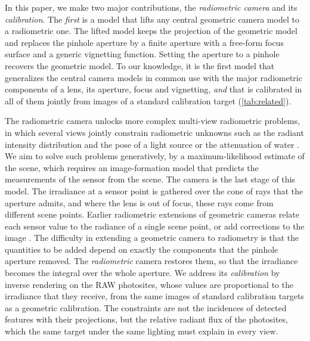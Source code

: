 In this paper, we make two major contributions, the \textit{radiometric camera} and its \textit{calibration}. The \textit{first} is a model that lifts any central geometric camera model to a radiometric
one. The lifted model keeps
the projection of the geometric model and replaces the pinhole
aperture by a finite aperture with a free-form focus surface and a
generic vignetting function. Setting the aperture to a pinhole
recovers the geometric model. To our knowledge, it is the first model
that generalizes the central camera models in common use with the major
radiometric components of a lens, its aperture, focus and vignetting,
\textit{and} that is calibrated in all of them jointly from images of a
standard calibration target (\cref{tab:related}).

The radiometric camera unlocks more complex multi-view radiometric
problems, in which several views jointly constrain radiometric
unknowns such as the radiant intensity distribution and the pose of a
light source
\cite{weber2001practical,park2014nonisotropic,visentini2015simultaneous,santo2018pinmotion}
or the attenuation of water
\cite{bryson2016truecolor,skinner2017automatic,akkaynak2019seathru,nakath2021insitu}.
We aim to solve such problems generatively, \ie by a maximum-likelihood estimate of the scene,
which requires an image-formation model that predicts the measurements
of the sensor from the scene. The camera is the last stage of this
model. The irradiance at a sensor point is gathered over the cone of rays that the
aperture admits, and where the lens is out of focus, these rays come
from different scene points. Earlier radiometric extensions of
geometric cameras relate each sensor value to the radiance of a single
scene point, or add corrections to the image
\cite{Kim-PAMI-2008,rehder2017direct,Hannemose_2019}. The difficulty in extending a geometric camera to
radiometry is that the quantities to be added depend on exactly the components that the
pinhole aperture removed. The \textit{radiometric} camera
restores them, so that the irradiance becomes the integral over the whole
aperture. We address its \textit{calibration} by inverse rendering on the RAW photosites, whose values are
proportional to the irradiance that they receive, from the same
images of standard calibration targets as a geometric
calibration. The constraints are not the incidences of detected
features with their projections, but the relative radiant flux of the
photosites, which the same target under the same lighting must explain
in every view.

